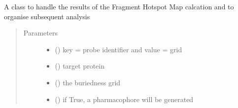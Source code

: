\documentclass[letterpaper,10pt,english]{sphinxmanual}
\begin{document}

\begin{fulllineitems}
\label{\detokenize{result_api:hotspots.result.Results}}
A class to handle the results of the Fragment Hotspot Map calcation and to organise subsequent analysis
\begin{quote}\begin{description}
\item[{Parameters}] \leavevmode\begin{itemize}
\item {} 
 () \textendash{} key = probe identifier and value = grid

\item {} 
 () \textendash{} target protein

\item {} 
 () \textendash{} the buriedness grid

\item {} 
 () \textendash{} if True, a pharmacophore will be generated

\end{itemize}

\end{description}\end{quote}

\begin{fulllineitems}
\label{\detokenize{result_api:hotspots.result.Results.from_grid_ensembles}}


\end{fulllineitems}
\end{fulllineitems}
\end{document}
